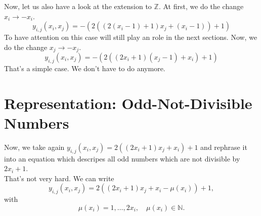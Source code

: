 Now, let us also have a look at the extension to $\mathbb{Z}$. At first, we do the change $x_{i} \rightarrow -x_{i}$. 
\begin{equation}
	y_{i,j}\left(x_{i},x_{j}\right) = -\left(2\left(\left(2\left(x_{i} - 1\right) + 1\right)x_{j} + \left(x_{i} - 1\right)\right) + 1\right)
\label{eq:repodddivnumbers_negi}
\end{equation}
To have attention on this case will still play an role in the next sections. Now, we do the change $x_{j} \rightarrow -x_{j}$.
\begin{equation}
	y_{i,j}\left(x_{i},x_{j}\right) = -\left(2\left(\left(2x_{i} + 1\right)\left(x_{j} - 1\right) + x_{i}\right) + 1\right)
\label{eq:repodddivnumbers_negj}
\end{equation}
That's a simple case. We don't have to do anymore.
 
\section{Representation: Odd-Not-Divisible Numbers}
\label{s:repoddnotdivnumbers}
Now, we take again $y_{i,j}\left(x_{i},x_{j}\right) = 2\left(\left(2x_{i} + 1\right)x_{j} + x_{i}\right) + 1$ and rephrase it into an equation which descripes all odd numbers which are not divisible by $2x_{i} + 1$. \\
That's not very hard. We can write
\begin{equation}
	y_{i,j}\left(x_{i},x_{j}\right) = 2\left(\left(2x_{i} + 1\right)x_{j} + x_{i} - \mu\left(x_{i}\right)\right) + 1,
\label{eq:repoddnotdivnumb}
\end{equation}
with
\begin{equation}
	\mu\left(x_{i}\right) = 1,\dots,2x_{i}, \quad \mu\left(x_{i}\right) \in \mathbb{N}.
\label{eq:defmu}
\end{equation}


